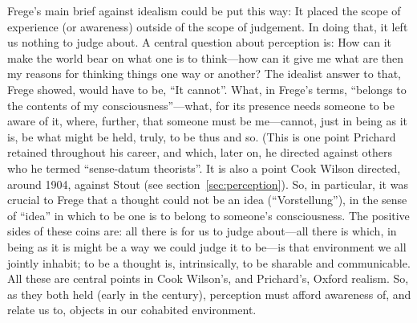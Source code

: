 Frege's main brief against idealism could be put this way: It placed the scope of experience (or awareness) outside of the scope of judgement. In doing that, it left us nothing to judge about. A central question about perception is: How can it make the world bear on what one is to think---how can it give me what are then my reasons for thinking things one way or another? The idealist answer to that, Frege showed, would have to be, ``It cannot''. What, in Frege's terms, ``belongs to the contents of my consciousness''---what, for its presence needs someone to be aware of it, where, further, that someone must be me---cannot, just in being as it is, be what might be held, truly, to be thus and so. (This is one point Prichard retained throughout his career, and which, later on, he directed against others who he termed ``sense-datum theorists''. It is also a point Cook Wilson directed, around 1904, against Stout (see section~\ref{sec:perception}).  So, in particular, it was crucial to Frege that a thought could not be an idea (``Vorstellung''), in the sense of ``idea'' in which to be one is to belong to someone’s consciousness. The positive sides of these coins are: all there is for us to judge about---all there is which, in being as it is might be a way we could judge it to be---is that environment we all jointly inhabit; to be a thought is, intrinsically, to be sharable and communicable. All these are central points in Cook Wilson's, and Prichard's, Oxford realism. So, as they both held (early in the century), perception must afford awareness of, and relate us to, objects in our cohabited environment.

